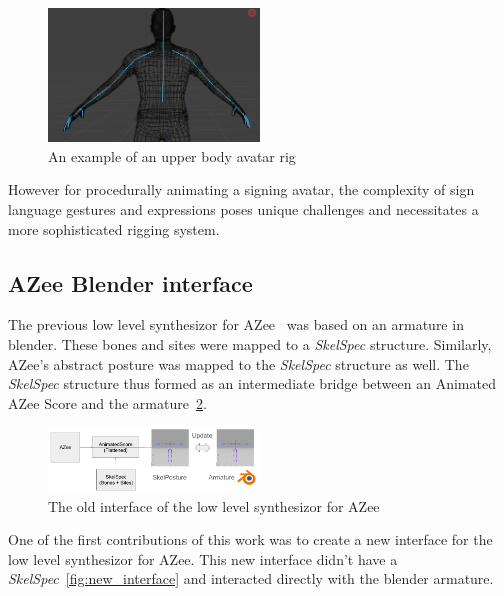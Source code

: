 \documentclass[../../main.tex]{subfiles}
\begin{document}
\begin{figure}[h]
    \centering
    \includegraphics[width=0.5\textwidth]{chapters/rigging_layers/images/upper_body_avatar.png}
    \caption{An example of an upper body avatar rig}
    \label{ref:upper_body_avatar}
\end{figure}

However for procedurally animating a signing avatar, the complexity of sign language gestures and expressions poses unique challenges and necessitates a more sophisticated rigging system.

\subsection{AZee Blender interface}
\label{ch:rigging_layers:proc_rig_signing_avatars:azee_blender_interface}

The previous low level synthesizor for AZee~\cite{nunnari2018animating} was based on an armature in blender. These bones and sites were mapped to a \emph{SkelSpec} structure. Similarly, AZee's abstract posture was mapped to the \emph{SkelSpec} structure as well. The \emph{SkelSpec} structure thus formed as an intermediate bridge between an Animated AZee Score and the armature~\ref{fig:old_interface}. 

\begin{figure}
    \centering
    \includegraphics[width=0.5\textwidth]{chapters/rigging_layers/images/old_interface.png}
    \caption{The old interface of the low level synthesizor for AZee}
    \label{fig:old_interface}
\end{figure}

One of the first contributions of this work was to create a new interface for the low level synthesizor for AZee. This new interface didn't have a \emph{SkelSpec}~\ref{fig:new_interface} and interacted directly with the blender armature. 
\end{document}
